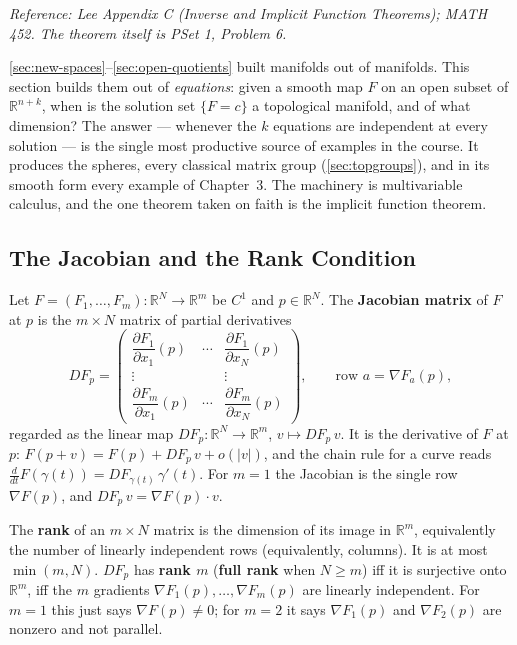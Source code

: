 \documentclass[11pt]{report}
\makeatletter
\newcounter{defcounter}[section]
\newcommand{\deflabel}[1]{\edef\@currentlabel{\arabic{section}.\arabic{defcounter}}\label{#1}}
\newcommand{\leeref}[1]{\par\smallskip{\raggedleft\footnotesize\textsc{Lee}:\ #1\par}}
\makeatother
\begin{document}
\textit{Reference: Lee Appendix C (Inverse and Implicit Function Theorems); MATH 452. The theorem itself is PSet 1, Problem 6.}

\begin{rembox}\label{rem:why-this-section-2}
\ref{sec:new-spaces}--\ref{sec:open-quotients} built manifolds out of manifolds. This section builds them out of \emph{equations}: given a smooth map $F$ on an open subset of $\mathbb{R}^{n+k}$, when is the solution set $\{F = c\}$ a topological manifold, and of what dimension? The answer --- whenever the $k$ equations are independent at every solution --- is the single most productive source of examples in the course. It produces the spheres, every classical matrix group (\ref{sec:topgroups}), and in its smooth form every example of Chapter~3. The machinery is multivariable calculus, and the one theorem taken on faith is the implicit function theorem.
\end{rembox}

\subsection{The Jacobian and the Rank Condition}\label{sub:jacobian}

\begin{defbox}\deflabel{def:jacobian}
Let $F = (F_1, \ldots, F_m) : \mathbb{R}^N \to \mathbb{R}^m$ be $C^1$ and $p \in \mathbb{R}^N$. The \textbf{Jacobian matrix} of $F$ at $p$ is the $m \times N$ matrix of partial derivatives
\[
DF_p = \begin{pmatrix}
\dfrac{\partial F_1}{\partial x_1}(p) & \cdots & \dfrac{\partial F_1}{\partial x_N}(p) \\[2mm]
\vdots & & \vdots \\[1mm]
\dfrac{\partial F_m}{\partial x_1}(p) & \cdots & \dfrac{\partial F_m}{\partial x_N}(p)
\end{pmatrix},
\qquad \text{row } a = \nabla F_a(p),
\]
regarded as the linear map $DF_p : \mathbb{R}^N \to \mathbb{R}^m$, $v \mapsto DF_p\, v$. It is the derivative of $F$ at $p$: $F(p + v) = F(p) + DF_p\, v + o(|v|)$, and the chain rule for a curve reads $\frac{d}{dt} F(\gamma(t)) = DF_{\gamma(t)}\, \gamma'(t)$. For $m = 1$ the Jacobian is the single row $\nabla F(p)$, and $DF_p\, v = \nabla F(p) \cdot v$.

The \textbf{rank} of an $m \times N$ matrix is the dimension of its image in $\mathbb{R}^m$, equivalently the number of linearly independent rows (equivalently, columns). It is at most $\min(m, N)$. $DF_p$ has \textbf{rank $m$} (\textbf{full rank} when $N \ge m$) iff it is surjective onto $\mathbb{R}^m$, iff the $m$ gradients $\nabla F_1(p), \ldots, \nabla F_m(p)$ are linearly independent. For $m = 1$ this just says $\nabla F(p) \neq 0$; for $m = 2$ it says $\nabla F_1(p)$ and $\nabla F_2(p)$ are nonzero and not parallel.
\leeref{App.~C, \emph{Total and Partial Derivatives}}
\end{defbox}
\end{document}

